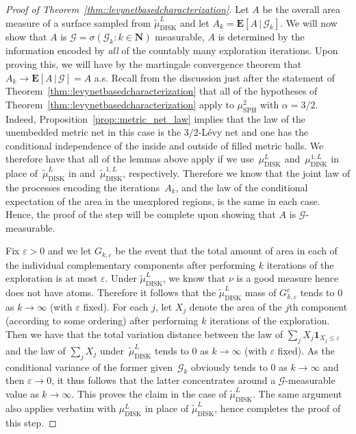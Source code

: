 \documentclass[10pt]{amsart}
\let\mathcal\mathscr
\let\epsilon\varepsilon
\theoremstyle{plain}
\numberwithin{theorem}{section}
\theoremstyle{definition}
\newcommand{\CG}{{\mathcal G}}
\newcommand \E {{\mathbf E}}
\newcommand{\N}{\mathbf{N}}
\newcommand{\one}{{\mathbf 1}}
\newcommand{\mustwo}{\mu_{\mathrm{SPH}}^2}
\newcommand{\mudonel}{\mu_{ \mathrm{DISK}}^{1, L}}
\newcommand{\mudl}{\mu_{\mathrm{DISK}}^L}
\newcommand{\tmudonel}{\wt{\mu}_{ \mathrm{DISK}}^{1, L}}
\newcommand{\tmudl}{\wt{\mu}_{\mathrm{DISK}}^L}
\let\wt\widetilde
\newcommand{\giv}{\,|\,}
\begin{document}
\begin{proof}[Proof of Theorem~\ref{thm::levynetbasedcharacterization}]
Let $A$ be the overall area measure of a surface sampled from $\tmudl$ and let $A_k = \E[ A \giv \CG_k]$. We will now show that $A$ is $\CG =\sigma(\CG_k : k \in \N)$ measurable, \ie $A$ is determined by the information encoded by \emph{all} of the countably many exploration iterations. Upon proving this, we will have by the martingale convergence theorem that $A_k \to \E[ A \giv \CG] = A$ a.s. Recall from the discussion just after the statement of Theorem~\ref{thm::levynetbasedcharacterization} that all of the hypotheses of Theorem~\ref{thm::levynetbasedcharacterization} apply to $\mustwo$ with $\alpha = 3/2$. Indeed, Proposition~\ref{prop::metric_net_law} implies that the law of the unembedded metric net in this case is the $3/2$-Lévy net and one has the conditional independence of the inside and outside of filled metric balls. We therefore have that all of the lemmas above apply if we use~$\mudl$ and~$\mudonel$ in place of~$\tmudl$ in and~$\tmudonel$, respectively. Therefore we know that the joint law of the processes encoding the iterations~$A_k$, and the law of the conditional expectation of the area in the unexplored regions, is the same in each case. Hence, the proof of the step will be complete upon showing that $A$ is $\CG$-measurable.

Fix $\epsilon > 0$ and we let $G_{k,\epsilon}$ be the event that the total amount of area in each of the individual complementary components after performing $k$ iterations of the exploration is at most $\epsilon$. Under $\tmudl$, we know that $\nu$ is a good measure hence does not have atoms. Therefore it follows that the $\tmudl$ mass of $G_{k,\epsilon}^c$ tends to $0$ as $k \to \infty$ (with $\epsilon$ fixed). For each $j$, let $X_j$ denote the area of the $j$th component (according to some ordering) after performing $k$ iterations of the exploration. Then we have that the total variation distance between the law of $\sum_j X_j \one_{X_j \leq \epsilon}$ and the law of $\sum_j X_j$ under~$\tmudl$ tends to $0$ as $k \to \infty$ (with $\epsilon$ fixed). As the conditional variance of the former given~$\CG_k$ obviously tends to $0$ as $k \to \infty$ and then $\epsilon \to 0$, it thus follows that the latter concentrates around a $\CG$-measurable value as $k \to \infty$. This proves the claim in the case of $\tmudl$. The same argument also applies verbatim with $\mudl$ in place of $\tmudl$, hence completes the proof of this step.


\end{proof}
\end{document}
